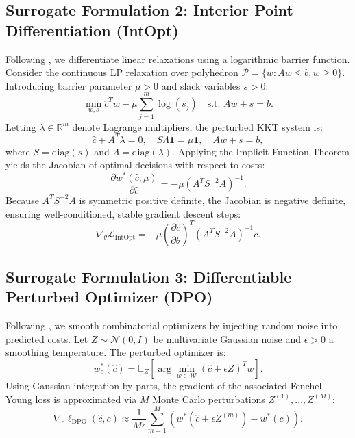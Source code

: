 \documentclass[11pt,a4paper]{article}
\theoremstyle{definition}
\theoremstyle{remark}
\begin{document}
\subsection{Surrogate Formulation 2: Interior Point Differentiation (IntOpt)}
Following \citet{mandi2020interior}, we differentiate linear relaxations using a logarithmic barrier function. Consider the continuous LP relaxation over polyhedron $\mathcal{P} = \{w : A w \le b, w \ge 0\}$. Introducing barrier parameter $\mu > 0$ and slack variables $s > 0$:
\begin{equation}
    \min_{w, s} \hat{c}^T w - \mu \sum_{j=1}^m \log(s_j) \quad \text{s.t. } A w + s = b. \label{eq:intopt_barrier}
\end{equation}
Letting $\lambda \in \mathbb{R}^m$ denote Lagrange multipliers, the perturbed KKT system is:
\begin{equation*}
    \hat{c} + A^T \lambda = 0, \quad S \Lambda \mathbf{1} = \mu \mathbf{1}, \quad A w + s = b,
\end{equation*}
where $S = \text{diag}(s)$ and $\Lambda = \text{diag}(\lambda)$.
Applying the Implicit Function Theorem yields the Jacobian of optimal decisions with respect to costs:
\begin{equation}
    \frac{\partial w^*(\hat{c}; \mu)}{\partial \hat{c}} = -\mu \left( A^T S^{-2} A \right)^{-1}. \label{eq:intopt_jacobian}
\end{equation}
Because $A^T S^{-2} A$ is symmetric positive definite, the Jacobian is negative definite, ensuring well-conditioned, stable gradient descent steps:
\begin{equation*}
    \nabla_\theta \mathcal{L}_{\text{IntOpt}} = -\mu \left( \frac{\partial \hat{c}}{\partial \theta} \right)^T \left( A^T S^{-2} A \right)^{-1} c.
\end{equation*}

\subsection{Surrogate Formulation 3: Differentiable Perturbed Optimizer (DPO)}
Following \citet{berthet2020learning}, we smooth combinatorial optimizers by injecting random noise into predicted costs. Let $Z \sim \mathcal{N}(0, I)$ be multivariate Gaussian noise and $\epsilon > 0$ a smoothing temperature. The perturbed optimizer is:
\begin{equation*}
    w_\epsilon^*(\hat{c}) = \mathbb{E}_Z \left[ \arg\min_{w \in \mathcal{W}} (\hat{c} + \epsilon Z)^T w \right].
\end{equation*}
Using Gaussian integration by parts, the gradient of the associated Fenchel-Young loss is approximated via $M$ Monte Carlo perturbations $Z^{(1)}, \dots, Z^{(M)}$:
\begin{equation*}
    \nabla_{\hat{c}} \ell_{\text{DPO}}(\hat{c}, c) \approx \frac{1}{M \epsilon} \sum_{m=1}^M \left( w^*(\hat{c} + \epsilon Z^{(m)}) - w^*(c) \right).
\end{equation*}
\end{document}
